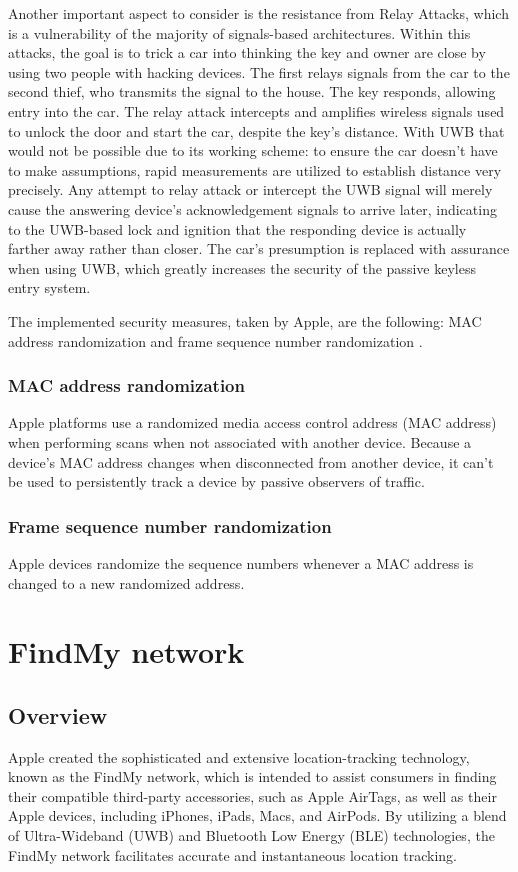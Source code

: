 \documentclass[english]{article}
\begin{document}
Another important aspect to consider is the resistance from Relay Attacks, which is a vulnerability of the majority of signals-based architectures. Within this attacks, the goal is to trick a car into thinking the key and owner are close by using two people with hacking devices. The first relays signals from the car to the second thief, who transmits the signal to the house. The key responds, allowing entry into the car. The relay attack intercepts and amplifies wireless signals used to unlock the door and start the car, despite the key's distance. With UWB that would not be possible due to its working scheme: to ensure the car doesn't have to make assumptions, rapid measurements are utilized to establish distance very precisely. Any attempt to relay attack or intercept the UWB signal will merely cause the answering device's acknowledgement signals to arrive later, indicating to the UWB-based lock and ignition that the responding device is actually farther away rather than closer. The car's presumption is replaced with assurance when using UWB, which greatly increases the security of the passive keyless entry system.

The implemented security measures, taken by Apple, are the following: MAC address randomization and frame sequence number randomization \cite{aps}.

\subsubsection*{MAC address randomization}
Apple platforms use a randomized media access control address (MAC address) when performing scans when not associated with another device. Because a device’s MAC address changes when disconnected from another device, it can’t be used to persistently track a device by passive observers of traffic.

\subsubsection*{Frame sequence number randomization}
Apple devices randomize the sequence numbers whenever a MAC address is changed to a new randomized address.

\section{FindMy network}\label{sec:find}
\subsection{Overview}
Apple created the sophisticated and extensive location-tracking technology, known as the FindMy network, which is intended to assist consumers in finding their compatible third-party accessories, such as Apple AirTags, as well as their Apple devices, including iPhones, iPads, Macs, and AirPods. By utilizing a blend of Ultra-Wideband (UWB) and Bluetooth Low Energy (BLE) technologies, the FindMy network facilitates accurate and instantaneous location tracking.
\end{document}
